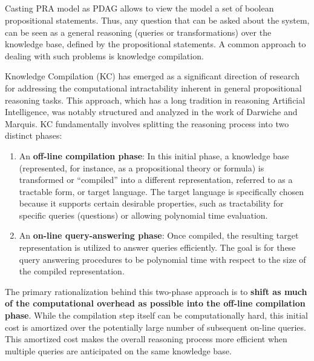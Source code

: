 \subsection{\color{blue}{Knowledge Compilation}}
Casting PRA model as PDAG allows to view the model a set of boolean propositional statements. Thus, any question that can be asked about the system, can be seen as a general reasoning (queries or transformations) over the knowledge base, defined by the propositional statements. A common approach to dealing with such problems is knowledge compilation.

Knowledge Compilation (KC) has emerged as a significant direction of research for addressing the computational intractability inherent in general propositional reasoning tasks. This approach, which has a long tradition in reasoning Artificial Intelligence, was notably structured and analyzed in the work of Darwiche and Marquis. KC fundamentally involves splitting the reasoning process into two distinct phases:
\begin{enumerate}
    \item An \textbf{off-line compilation phase}: In this initial phase, a knowledge base (represented, for instance, as a propositional theory or formula) is transformed or ``compiled'' into a different representation, referred to as a tractable form, or target language. The target language is specifically chosen because it supports certain desirable properties, such as tractability for specific queries (questions) or allowing polynomial time evaluation.
    \item An \textbf{on-line query-answering phase}: Once compiled, the resulting target representation is utilized to answer queries efficiently. The goal is for these query answering procedures to be polynomial time with respect to the size of the compiled representation.
\end{enumerate}
The primary rationalization behind this two-phase approach is to \textbf{shift as much of the computational overhead as possible into the off-line compilation phase}. While the compilation step itself can be computationally hard, this initial cost is amortized over the potentially large number of subsequent on-line queries. This amortized cost makes the overall reasoning process more efficient when multiple queries are anticipated on the same knowledge base.


